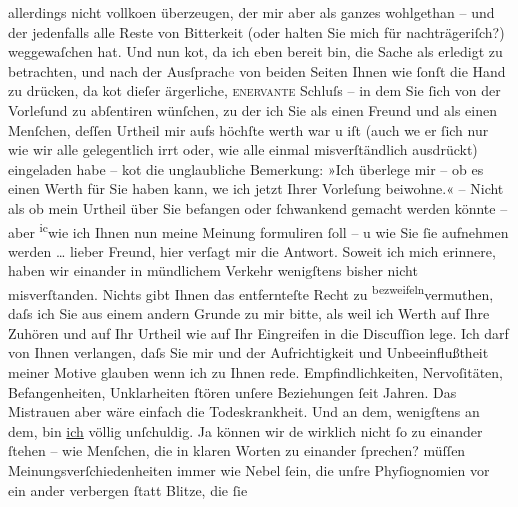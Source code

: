 \begin{ledgroupsized}[t]{13cm}
               allerdings nicht vollko{\geminationm}en überzeugen, der mir aber als
               ganzes wohlgethan – und der jedenfalls alle Reste von Bitterkeit (oder halten Sie
               mich für nachträgeriſch?) weggewaſchen hat. Und nun ko{\geminationm}t, da ich eben bereit bin, die Sache als erledigt zu betrachten, und nach der
                  Ausſprach\textcolor{gray}{e} von beiden Seiten {\pb}Ihnen wie ſonſt die Hand zu drücken, da ko{\geminationm}t dieſer ärgerliche, \textsc{enervante} Schluſs – in dem Sie ſich von der Vorleſund zu abſentiren
               wünſchen, zu der ich Sie als einen Freund und als einen Menſchen, deſſen Urtheil mir
               aufs höchſte werth war u iſt (auch we{\geminationn} er ſich nur wie
               wir alle {\pb}gelegentlich irrt oder, wie alle
               einmal misverſtändlich ausdrückt) eingeladen habe – ko{\geminationm}t
               die unglaubliche Bemerkung: »Ich überlege mir – ob es einen Werth für Sie haben kann,
                  we{\geminationn} ich jetzt Ihrer Vorleſung beiwohne.« – Nicht als
               ob mein Urtheil über Sie befangen oder ſchwankend gemacht werden könnte – aber \substVorne{}\textsuperscript{ic}\substDazwischen{}wie\substHinten{} ich Ihnen nun meine {\pb}Meinung
               formuliren ſoll – u wie Sie ſie aufnehmen werden {\dots} lieber
               Freund, hier verſagt mir die Antwort. Soweit ich mich erinnere, haben wir einander in
               mündlichem Verkehr wenigſtens bisher nicht misverſtanden.  Nichts gibt Ihnen das entfernteſte Recht zu \substVorne{}\textsuperscript{bezweifeln}{\allowbreak}\substDazwischen{}vermuthen\substHinten{}, daſs ich Sie aus einem andern {\pb}Grunde zu mir bitte, als weil ich Werth auf Ihre Zuhören und auf Ihr Urtheil wie
               auf Ihr Eingreifen in die Discuſſion lege. Ich darf von Ihnen verlangen, daſs Sie mir
               und der Aufrichtigkeit \introOben{}und Unbeeinflußtheit\introOben{} meiner Motive
               glauben wenn ich zu Ihnen rede. Empfindlichkeiten, Nervoſitäten, Befan{\pb}genheiten, Unklarheiten ſtören unſere
               Beziehungen ſeit Jahren. Das Mistrauen aber wäre einfach die Todeskrankheit. Und an
               dem, wenigſtens an dem, bin \uline{ich} völlig unſchuldig. Ja
               können wir de{\geminationn} wirklich nicht ſo zu einander ſtehen –
               wie Menſchen, die in klaren Worten zu einander ſprechen? {\pb}müſſen Meinungsverſchiedenheiten immer wie
               Nebel ſein, die unſre Phyſiognomien vor ein ander verbergen ſtatt Blitze, die ſie

\end{ledgroupsized}
